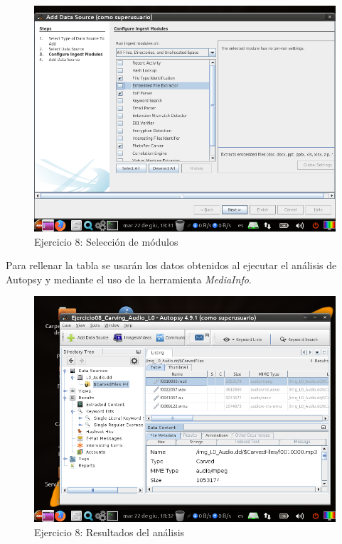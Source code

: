 \documentclass[11pt]{article}
\begin{document}
\begin{figure}[H]
    \caption{Ejercicio 8: Selección de módulos}
    \centering
    \includegraphics[scale=0.7]{e8-4.png}
\end{figure}

Para rellenar la tabla se usarán los datos obtenidos al ejecutar el análisis de Autopsy y mediante el uso de la herramienta \textit{MediaInfo}.

\begin{figure}[H]
    \caption{Ejercicio 8: Resultados del análisis}
    \centering
    \includegraphics[scale=0.7]{e8-5.png}
\end{figure}
\end{document}
